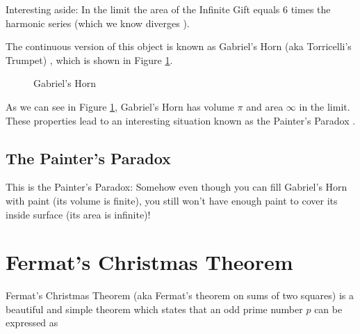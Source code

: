 \documentclass{article}
\theoremstyle{definition}
\begin{document}
\bigskip
\noindent
Interesting aside: In the limit the area of the 
Infinite Gift equals 6 times the harmonic series
(which we know diverges \cite{wiki:harmonic}).


\bigskip
\noindent
The continuous version of this object is known as Gabriel's Horn
(aka Torricelli’s Trumpet) \cite{wolfram:gabriels_horn}, which is
shown in Figure \ref{fig:gabriels_horn}.

\bigskip
\begin{figure} [H]
\caption{Gabriel's Horn}
\label{fig:gabriels_horn}
\end{figure}

\bigskip
\noindent
As we can see in Figure \ref{fig:gabriels_horn}, Gabriel's Horn
has volume $\pi$ and area $\infty$ in the limit. These properties
lead to an interesting situation known as the Painter's Paradox
\cite{painters_paradox_2,painters_paradox,painters_paradox_1}.
%
%
%
\subsection{The Painter's Paradox}
This is the Painter's Paradox: Somehow even though you can 
fill Gabriel's Horn with paint (its volume is finite), you 
still won't have enough paint to cover its inside surface 
(its area is infinite)!
%
%
%
\section{Fermat's Christmas Theorem}
%
%
%
\noindent
Fermat's Christmas Theorem (aka Fermat's theorem on sums of two
squares) is a beautiful and simple
theorem which states that an odd prime number $p$ can be
expressed as
\end{document}
